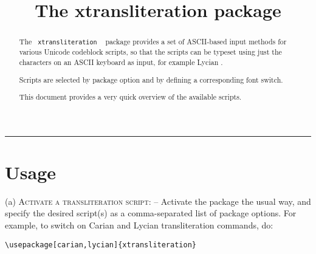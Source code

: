 \documentclass{article}
\title{The xtransliteration package}
\author{}
\date{}
\newcommand\tentry[5]{%
#1 &
\metac{#2} &
\metacb{#3} &
#4 &
#5{#4} \\

}
\newcommand\sep{\vspace{1.2ex}\hskip 0.3\textwidth\leaders\hrule width 0.3\textwidth\hskip 0.3\textwidth\vspace{1.8ex}}
\begin{document}
\maketitle
\begin{abstract}
The ~\texttt{xtransliteration} ~ package provides a set of \textsc{ASCII}-based input methods for various Unicode codeblock scripts, so that the scripts can be typeset using just the characters on an \textsc{ASCII} keyboard as input, for example Lycian .
\par Scripts are selected by package option and by defining a corresponding font switch.
\par This document provides a very quick overview of the available scripts.

\end{abstract}

\sep




\section{Usage}
(a) \textsc{Activate a transliteration script}: -- Activate the package the usual way, and specify the desired script(s) as a comma-separated list of package options. For example, to switch on Carian and Lycian transliteration commands, do:

\begin{verbatim}
\usepackage[carian,lycian]{xtransliteration}
\end{verbatim}
\end{document}
